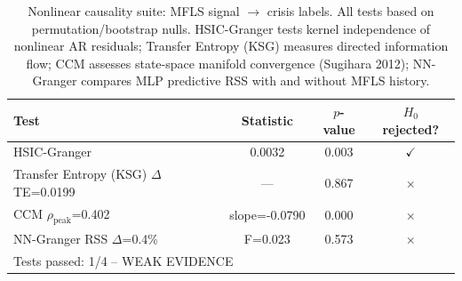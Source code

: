 \begin{table}[h]
\centering
\caption{Nonlinear causality suite: MFLS signal $\to$ crisis labels. All tests based on permutation/bootstrap nulls. HSIC-Granger tests kernel independence of nonlinear AR residuals; Transfer Entropy (KSG) measures directed information flow; CCM assesses state-space manifold convergence (Sugihara 2012); NN-Granger compares MLP predictive RSS with and without MFLS history.}
\label{tab:nonlinear_causality}
\begin{tabular}{lccc}
\toprule
Test & Statistic & $p$-value & $H_0$ rejected? \\
\midrule
  HSIC-Granger & 0.0032 & 0.003 & {\color{teal}$\checkmark$} \\
  Transfer Entropy (KSG) $\Delta$TE=0.0199 & --- & 0.867 & {\color{red}$\times$} \\
  CCM $\rho_{\mathrm{peak}}$=0.402 & slope=-0.0790 & 0.000 & {\color{red}$\times$} \\
  NN-Granger RSS $\Delta$=0.4\% & F=0.023 & 0.573 & {\color{red}$\times$} \\
\midrule
  \multicolumn{4}{l}{Tests passed: 1/4 -- WEAK EVIDENCE} \\
\bottomrule
\end{tabular}
\end{table}